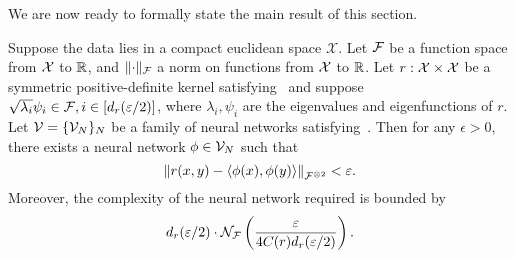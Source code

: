 We are now ready to formally state the main result of this section.

\begin{theorem}\label{theorem:symmetric_inner_prod_rels_func_class}
	Suppose the data lies in a compact euclidean space $\mathcal{X}$. Let ${\mathcal{F}}$ be a function space from ${\mathcal{X}}$ to $\mathbb{R}$, and $\lVert\cdot\rVert_{\mathcal{F}}$ a norm on functions from  ${\mathcal{X}}$ to $\mathbb{R}$.
	Let $r: {\mathcal{X}} \times {\mathcal{X}}$ be a symmetric positive-definite kernel satisfying~ and suppose $\sqrt{\lambda_i} \psi_i \in {\mathcal{F}}, i \in [d_r(\varepsilon / 2)]$, where $\lambda_i, \psi_i$ are the eigenvalues and eigenfunctions of $r$.
	Let ${\mathcal{V}} = \{{\mathcal{V}}_N\}_N$ be a family of neural networks satisfying~.
	Then for any $\epsilon > 0$, there exists a neural network $\phi \in {\mathcal{V}}_N$ such that 
	\[\left\lVert r(x,y) - \left \langle \phi(x), \phi(y) \right\rangle\right\rVert_{{\mathcal{F}}^{\otimes 2}} < \varepsilon.\]
	Moreover, the complexity of the neural network required is bounded by
	\[d_r(\varepsilon/2) \cdot {\mathcal{N}}_{\mathcal{F}}\left(\frac{\varepsilon}{4 C(r) d_r(\varepsilon/2)}\right).\]
\end{theorem}

